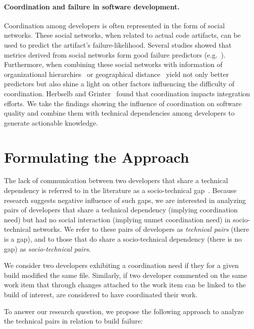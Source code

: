 \documentclass[conference]{IEEEtran}
\begin{document}
\paragraph{Coordination and failure in software development.}
Coordination among developers is often represented in the form of social networks.
These social networks, when related to actual code artifacts, can be used to predict the artifact's failure-likelihood.
Several studies showed that metrics derived from social networks form good failure predictors (e.g.~\cite{meneely:fse:2008}).
Furthermore, when combining these social networks with information of organizational hierarchies~\cite{nagappan:icse:2008} or geographical distance~\cite{bird:acm:2009} yield not only better predictors but also shine a light on other factors influencing the difficulty of coordination.
Herbselb and Grinter~\cite{herbsleb:icse:1999} found that coordination impacts integration efforts.
We take the findings showing the influence of coordination on software quality and combine them with technical dependencies among developers to generate actionable knowledge.



\section{Formulating the Approach}
The lack of communication between two developers that share a
technical dependency is referred to in the literature as a
socio-technical gap~\cite{valetto:msr:2007}. Because research suggests negative influence of such gaps, we are interested in analyzing pairs of developers that share a technical dependency (implying coordination need) but had no social interaction (implying
unmet coordination need) in socio-technical networks. We refer to these pairs of
developers as \emph{technical pairs} (there is a gap), and to those that do
share a socio-technical dependency (there is no gap) as \emph{socio-technical pairs}. 

We consider two developers exhibiting a coordination need if they for a given build modified the same file.
Similarly, if two developer commented on the same work item that through changes attached to the work item can be linked to the build of interest, are considered to have coordinated their work.

To answer our research question, we propose the following approach to analyze the technical pairs in relation to build failure:
\end{document}
